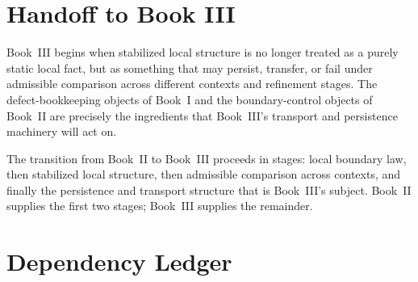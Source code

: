 \documentclass[12pt,oneside]{amsbook}
\theoremstyle{plain}
\theoremstyle{definition}
\theoremstyle{remark}
\begin{document}
\section{Handoff to Book III}

Book~III begins when stabilized local structure is no longer treated
as a purely static local fact, but as something that may persist,
transfer, or fail under admissible comparison across different contexts
and refinement stages.  The defect-bookkeeping objects of Book~I and
the boundary-control objects of Book~II are precisely the ingredients
that Book~III's transport and persistence machinery will act on.

The transition from Book~II to Book~III proceeds in stages: local
boundary law, then stabilized local structure, then admissible
comparison across contexts, and finally the persistence and transport
structure that is Book~III's subject.  Book~II supplies the first two
stages; Book~III supplies the remainder.

\section{Dependency Ledger}
\end{document}
